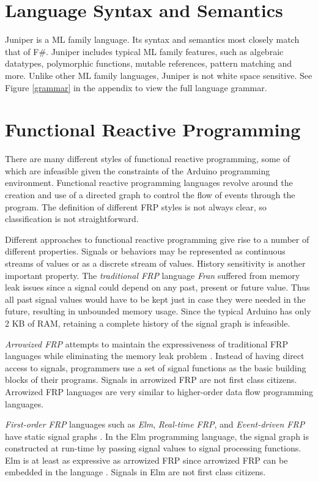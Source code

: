 \documentclass{sigplanconf}
\begin{document}
\section{Language Syntax and Semantics}
Juniper is a ML family language. Its syntax and semantics most closely match that of F\#. Juniper includes typical ML family features, such as algebraic datatypes, polymorphic functions, mutable references, pattern matching and more. Unlike other ML family languages, Juniper is not white space sensitive. See Figure \ref{grammar} in the appendix to view the full language grammar.

\section{Functional Reactive Programming}

There are many different styles of functional reactive programming, some of which are infeasible given the constraints of the Arduino programming environment. Functional reactive programming languages revolve around the creation and use of a directed graph to control the flow of events through the program. The definition of different FRP styles is not always clear, so classification is not straightforward.

Different approaches to functional reactive programming give rise to a number of different properties. Signals or behaviors may be represented as continuous streams of values or as a discrete stream of values. History sensitivity is another important property. The \textit{traditional FRP} language \textit{Fran} \citep{fran} suffered from memory leak issues since a signal could depend on any past, present or future value. Thus all past signal values would have to be kept just in case they were needed in the future, resulting in unbounded memory usage. Since the typical Arduino has only 2 KB of RAM, retaining a complete history of the signal graph is infeasible.

\textit{Arrowized FRP} attempts to maintain the expressiveness of traditional FRP languages while eliminating the memory leak problem \cite{Leak07}. Instead of having direct access to signals, programmers use a set of signal functions as the basic building blocks of their programs. Signals in arrowized FRP are not first class citizens. Arrowized FRP languages are very similar to higher-order data flow programming languages.

\textit{First-order FRP} languages such as \textit{Elm}, \textit{Real-time FRP}, and \textit{Event-driven FRP} have static signal graphs \cite{controllingtimeandspace}. In the Elm programming language, the signal graph is constructed at run-time by passing signal values to signal processing functions. Elm is at least as expressive as arrowized FRP since arrowized FRP can be embedded in the language \cite{czaplicki2012elm}. Signals in Elm are not first class citizens.
\end{document}
